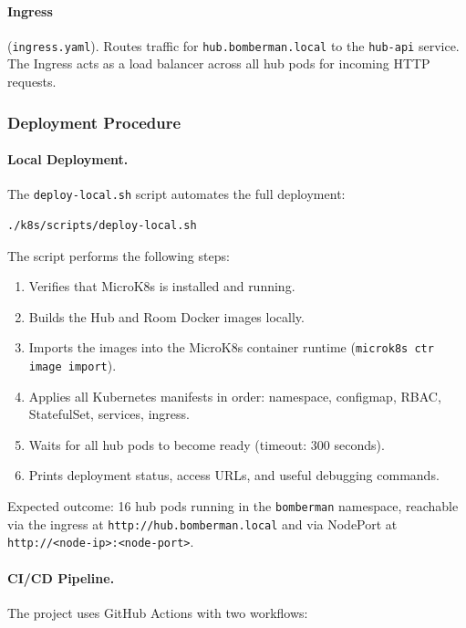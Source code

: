 \paragraph{Ingress} (\texttt{ingress.yaml}).
Routes traffic for \texttt{hub.bomberman.local} to the \texttt{hub-api} service.
The Ingress acts as a load balancer across all hub pods for incoming HTTP requests.

\subsubsection{Deployment Procedure}

\paragraph{Local Deployment.}
The \texttt{deploy-local.sh} script automates the full deployment:

\begin{verbatim}
./k8s/scripts/deploy-local.sh
\end{verbatim}

The script performs the following steps:
\begin{enumerate}
  \item Verifies that MicroK8s is installed and running.
  \item Builds the Hub and Room Docker images locally.
  \item Imports the images into the MicroK8s container runtime (\texttt{microk8s ctr image import}).
  \item Applies all Kubernetes manifests in order: namespace, configmap, RBAC, StatefulSet, services, ingress.
  \item Waits for all hub pods to become ready (timeout: 300 seconds).
  \item Prints deployment status, access URLs, and useful debugging commands.
\end{enumerate}

Expected outcome: 16 hub pods running in the \texttt{bomberman} namespace, reachable via the ingress at \texttt{http://hub.bomberman.local} and via NodePort at \texttt{http://<node-ip>:<node-port>}.

\paragraph{CI/CD Pipeline.}
The project uses GitHub Actions with two workflows:

